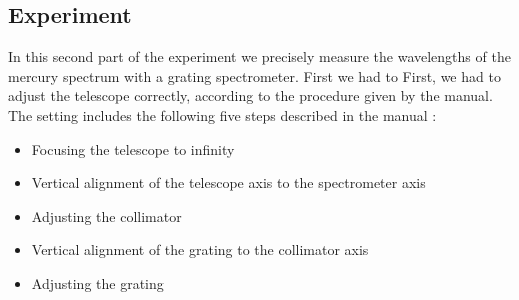 \subsection{Experiment}
In this second part of the experiment we precisely measure the wavelengths of the mercury spectrum with a grating spectrometer.
First we had to First, we had to adjust the telescope correctly, according to the procedure given by the manual\cite{manual}.
The setting includes the following five steps described in the manual \cite{manual}:
\begin{itemize}
	\item Focusing the telescope to infinity
	\item Vertical alignment of the telescope axis to the spectrometer axis
	\item Adjusting the collimator
	\item Vertical alignment of the grating to the collimator axis
	\item Adjusting the grating
\end{itemize}

